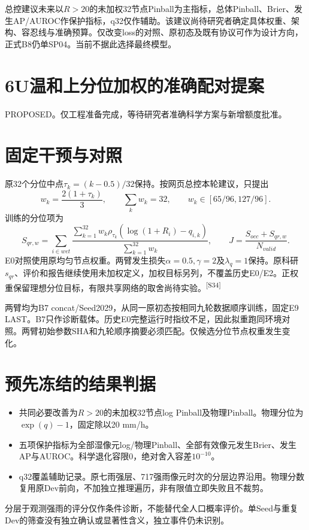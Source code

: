 \documentclass[UTF8,10.5pt,a4paper,fontset=none]{ctexart}
\newcommand{\evi}[1]{\textsuperscript{\color{muted}[#1]}}
\newcommand{\pageheading}[2]{\clearpage\section*{#1}\textcolor{muted}{#2}\par\vspace{3pt}}
\begin{document}
总控建议未来以$R>20$的未加权32节点Pinball为主指标，总体Pinball、Brier、发生AP/AUROC作保护指标，q32仅作辅助。该建议尚待研究者确定具体权重、架构、容忍线与准确预算。仅改变loss的对照、原初态及既有协议可作为设计方向，正式B8仍单SP04。当前不据此选择最终模型。

\pageheading{6U\quad 温和上分位加权的准确配对提案}{PROPOSED。仅工程准备完成，等待研究者准确科学方案与新增额度批准。}
\section*{固定干预与对照}
原32个分位中点$\tau_k=(k-0.5)/32$保持。按网页总控本轮建议，只提出
\[w_k=\frac{2(1+\tau_k)}{3},\qquad \sum_k w_k=32,\qquad w_k\in[65/96,127/96].\]
训练的分位项为
\[S_{qr,w}=\sum_{i\in wet}\frac{\sum_{k=1}^{32}w_k\rho_{\tau_k}(\log(1+R_i)-q_{i,k})}{\sum_{k=1}^{32}w_k},\qquad J=\frac{S_{occ}+S_{qr,w}}{N_{valid}}.\]
E0对照使用原均匀节点权重。两臂发生损失$\alpha=0.5,\gamma=2$及$\lambda_q=1$保持。原科研$s_{qr}$、评价和报告继续使用未加权定义，加权目标另列，不覆盖历史E0/E2。正权重保留理想分位目标，有限共享网络的取舍尚待实验。\evi{S34}

两臂均为B7 concat/Seed2029，从同一原初态按相同九轮数据顺序训练，固定E9 LAST。B7只作诊断载体。历史E0完整运行时指纹不足，因此拟重跑同环境对照。两臂初始参数SHA和九轮顺序摘要必须匹配。仅候选分位节点权重发生变化。

\section*{预先冻结的结果判据}
\begin{itemize}
\item 共同必要改善为$R>20$的未加权32节点log Pinball及物理Pinball。物理分位为$\exp(q)-1$，固定除以20 mm/h。
\item 五项保护指标为全部湿像元log/物理Pinball、全部有效像元发生Brier、发生AP与AUROC。科学退化容限0，绝对舍入容差$10^{-10}$。
\item q32覆盖辅助记录。原七雨强层、717强雨像元时次的分层边界沿用。物理分数复用原Dev前向，不加独立推理遍历，非有限值立即失败且不裁剪。
\end{itemize}
分层于观测强雨的评分仅作条件诊断，不能替代全人口概率评价。单Seed与重复Dev的筛查没有独立确认或显著性含义，独立事件仍未识别。

\newpage
\end{document}
